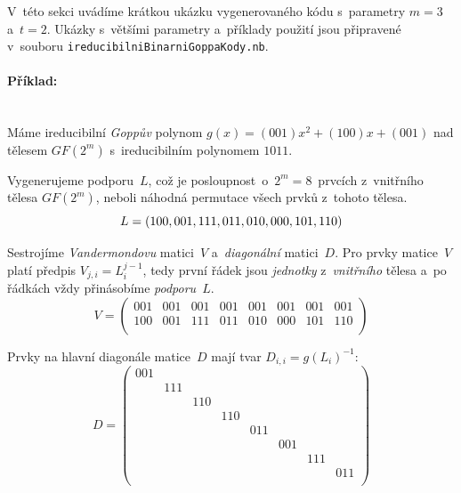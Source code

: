 \documentclass[thesis=M,czech,hidelinks]{FITthesis}[2012/06/26]
\newcommand{\0}{{\textcolor[gray]{0.75}{0}}}
\begin{document}
V~této sekci uvádíme krátkou ukázku vygenerovaného kódu s~parametry $m = 3$
a~$t = 2$. Ukázky s~většími parametry a~příklady použití jsou připravené
v~souboru \texttt{ireducibilniBinarniGoppaKody.nb}.

\paragraph{Příklad:} \hfil \\
Máme ireducibilní \emph{Goppův} polynom $g(x) = (001)x^2 + (100)x + (001)$ nad
tělesem $GF(2^m)$ s~ireducibilním polynomem $1011$.

Vygenerujeme podporu~$L$, což je posloupnost~o~$2^m = 8$~prvcích z~vnitřního
tělesa $GF(2^m)$, neboli náhodná permutace všech prvků z~tohoto tělesa.
$$
    L = \left(
            100, 001, 111, 011, 010, 000, 101, 110 \\
    \right)
$$

Sestrojíme \emph{Vandermondovu} matici~$V$ a~\emph{diagonální} matici~$D$. Pro
prvky matice~$V$ platí předpis $V_{j,i} = L_i^{j-1}$, tedy první řádek jsou
\emph{jednotky} z~\emph{vnitřního} tělesa a~po řádkách vždy přinásobíme
\emph{podporu}~$L$.
$$
    V = \left(
        \begin{array}{*{8}{c}}
            001 & 001 & 001 & 001 & 001 & 001 & 001 & 001 \\
            100 & 001 & 111 & 011 & 010 & 000 & 101 & 110 \\
        \end{array}
    \right)
$$

Prvky na hlavní diagonále matice~$D$ mají tvar $D_{i,i} = g(L_i)^{-1}$:
$$
    D = \left(
        \begin{array}{*{8}{c}}
            001 &     &     &     &     &     &     &     \\
                & 111 &     &     &     &     &     &     \\
                &     & 110 &     &     &     &     &     \\
                &     &     & 110 &     &     &     &     \\
                &     &     &     & 011 &     &     &     \\
                &     &     &     &     & 001 &     &     \\
                &     &     &     &     &     & 111 &     \\
                &     &     &     &     &     &     & 011 \\
        \end{array}
    \right)
$$
\end{document}
